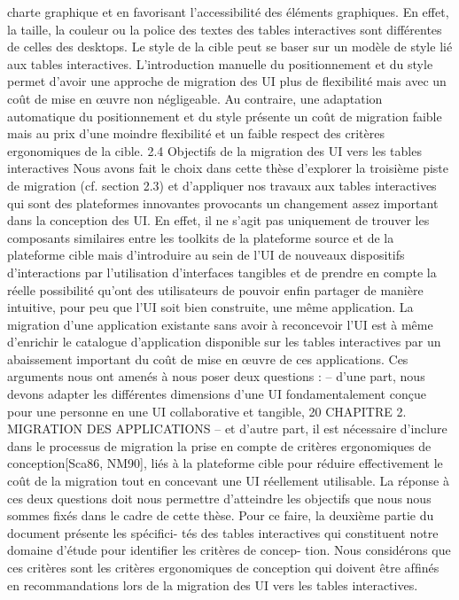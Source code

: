\documentclass{article}
\begin{document}
charte graphique et en favorisant l’accessibilité des éléments graphiques. En effet, la taille, la
couleur ou la police des textes des tables interactives sont différentes de celles des desktops. Le
style de la cible peut se baser sur un modèle de style lié aux tables interactives.
L’introduction manuelle du positionnement et du style permet d’avoir une approche de migration
des UI plus de ﬂexibilité mais avec un coût de mise en œuvre non négligeable. Au contraire, une
adaptation automatique du positionnement et du style présente un coût de migration faible mais au
prix d’une moindre ﬂexibilité et un faible respect des critères ergonomiques de la cible.
2.4
Objectifs de la migration des UI vers les tables interactives
Nous avons fait le choix dans cette thèse d’explorer la troisième piste de migration (cf. section 2.3)
et d’appliquer nos travaux aux tables interactives qui sont des plateformes innovantes provocants
un changement assez important dans la conception des UI. En effet, il ne s’agit pas uniquement de
trouver les composants similaires entre les toolkits de la plateforme source et de la plateforme cible
mais d’introduire au sein de l’UI de nouveaux dispositifs d’interactions par l’utilisation d’interfaces
tangibles et de prendre en compte la réelle possibilité qu’ont des utilisateurs de pouvoir enﬁn partager
de manière intuitive, pour peu que l’UI soit bien construite, une même application. La migration d’une
application existante sans avoir à reconcevoir l’UI est à même d’enrichir le catalogue d’application
disponible sur les tables interactives par un abaissement important du coût de mise en œuvre de ces
applications.
Ces arguments nous ont amenés à nous poser deux questions :
– d’une part, nous devons adapter les différentes dimensions d’une UI fondamentalement conçue
pour une personne en une UI collaborative et tangible,
20
CHAPITRE 2. MIGRATION DES APPLICATIONS
– et d’autre part, il est nécessaire d’inclure dans le processus de migration la prise en compte
de critères ergonomiques de conception[Sca86, NM90], liés à la plateforme cible pour réduire
effectivement le coût de la migration tout en concevant une UI réellement utilisable.
La réponse à ces deux questions doit nous permettre d’atteindre les objectifs que nous nous sommes
ﬁxés dans le cadre de cette thèse. Pour ce faire, la deuxième partie du document présente les spéciﬁci-
tés des tables interactives qui constituent notre domaine d’étude pour identiﬁer les critères de concep-
tion. Nous considérons que ces critères sont les critères ergonomiques de conception qui doivent être
afﬁnés en recommandations lors de la migration des UI vers les tables interactives.
\end{document}
